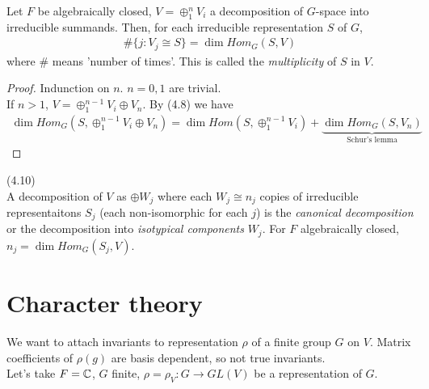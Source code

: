 \documentclass[a4paper]{article}
\begin{document}
\begin{lemma}
Let $F$ be algebraically closed, $V=\oplus_1^n V_i$ a decomposition of $G$-space into irreducible summands. Then, for each irreducible representation $S$ of $G$,
\begin{equation*}
\begin{aligned}
\#\{j:V_j \cong S\} = \dim Hom_G(S,V)
\end{aligned}
\end{equation*}
where $\#$ means 'number of times'. This is called the \emph{multiplicity} of $S$ in $V$.
\begin{proof}
Indunction on $n$. $n=0,1$ are trivial.\\
If $n>1$, $V=\oplus_1^{n-1} V_i \oplus V_n$. By (4.8) we have
\begin{equation*}
\begin{aligned}
\dim Hom_G (S,\oplus_1^{n-1} V_i \oplus V_n) = \dim Hom(S,\oplus_1^{n-1} V_i) + \underbrace{\dim Hom_G (S,V_n)}_{\text{Schur's lemma}}
\end{aligned}
\end{equation*}
\end{proof}
\end{lemma}

\begin{defi} (4.10)\\
A decomposition of $V$ as $\oplus W_j$ where each $W_j \cong n_j$ copies of irreducible representaitons $S_j$ (each non-isomorphic for each $j$) is the \emph{canonical decomposition} or the decomposition into \emph{isotypical components} $W_j$. For $F$ algebraically closed, $n_j=\dim Hom_G(S_j,V)$.
\end{defi}

\newpage

\section{Character theory}

We want to attach invariants to representation $\rho$ of a finite group $G$ on $V$. Matrix coefficients of $\rho(g)$ are basis dependent, so not true invariants.\\
Let's take $F=\mathbb{C}$, $G$ finite, $\rho=\rho_V: G \to GL(V)$ be a representation of $G$.
\end{document}
